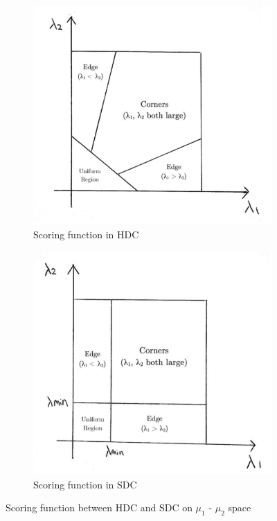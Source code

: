 \documentclass[a4paper, 12pt]{article}
\begin{document}
\begin{figure}[H]
    \centering
    \begin{subfigure}{0.4\textwidth}
        \centering
        \includegraphics[width=\textwidth]{HDC R Scoring.png}
        \caption{Scoring function in HDC}
        \label{Scoring HDC}
    \end{subfigure}
    \begin{subfigure}{0.4\textwidth}
        \centering
        \includegraphics[width=\textwidth]{SDC R scoring.png}
        \caption{Scoring function in SDC}
        \label{Scoring SDC}
    \end{subfigure}
    \caption{Scoring function between HDC and SDC on $\mu_1$ - $\mu_2$ space}
    \label{Figure 10}
\end{figure}
\end{document}
